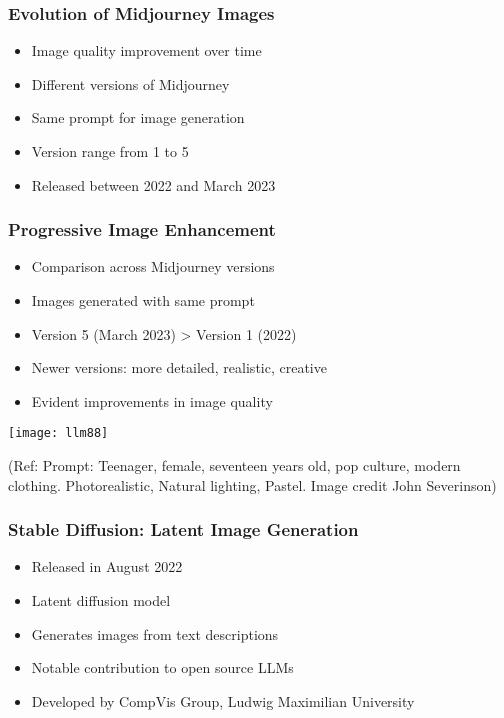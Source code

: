 \begin{frame}[fragile]\frametitle{Evolution of Midjourney Images}
    
    \begin{itemize}
        \item Image quality improvement over time
        \item Different versions of Midjourney
        \item Same prompt for image generation
        \item Version range from 1 to 5
        \item Released between 2022 and March 2023
    \end{itemize}
\end{frame}

\begin{frame}[fragile]\frametitle{Progressive Image Enhancement}
    
    \begin{itemize}
        \item Comparison across Midjourney versions
        \item Images generated with same prompt
        \item Version 5 (March 2023) > Version 1 (2022)
        \item Newer versions: more detailed, realistic, creative
        \item Evident improvements in image quality
    \end{itemize}
	
\begin{center}
\texttt{[image: llm88]}
\end{center}		

{\tiny (Ref: Prompt: Teenager, female, seventeen years old, pop culture, modern clothing. Photorealistic, Natural lighting, Pastel. Image credit John Severinson)}
		
\end{frame}


\begin{frame}[fragile]\frametitle{Stable Diffusion: Latent Image Generation}
    
    \begin{itemize}
        \item Released in August 2022
        \item Latent diffusion model
        \item Generates images from text descriptions
        \item Notable contribution to open source LLMs
        \item Developed by CompVis Group, Ludwig Maximilian University
    \end{itemize}

\end{frame}

